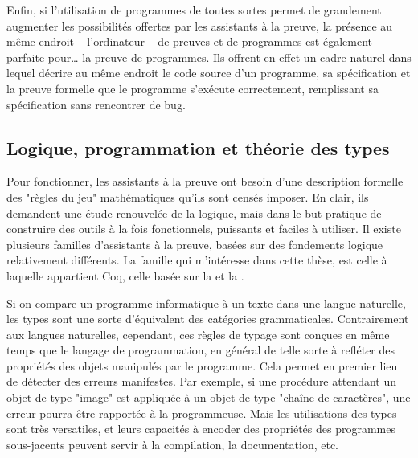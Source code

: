 Enfin, si l’utilisation de programmes de toutes sortes permet de grandement augmenter
les possibilités offertes par les assistants à la preuve,
la présence au même endroit – l’ordinateur –
de preuves et de programmes est également parfaite pour… la preuve de programmes.
Ils offrent en effet un cadre naturel dans lequel décrire au même endroit
le code source d’un programme, sa spécification et la preuve formelle que le
programme s’exécute correctement,
remplissant sa spécification sans rencontrer de bug.

\subsection{Logique, programmation et théorie des types}

Pour fonctionner, les assistants à la preuve ont besoin d’une
description formelle des "règles du jeu" mathématiques qu’ils sont censés imposer.
En clair, ils demandent une étude renouvelée de la logique, mais dans le but
pratique de construire des outils à la fois fonctionnels,
puissants et faciles à utiliser.
Il existe plusieurs familles d’assistants à la preuve, basées sur des fondements
logique relativement différents. La famille qui m’intéresse dans cette thèse, est
celle à laquelle appartient Coq, celle basée sur la
 et la .

Si on compare un programme informatique à un texte dans une langue naturelle,
les types sont une sorte d’équivalent des catégories grammaticales.
Contrairement aux langues naturelles, cependant, ces règles de typage sont conçues
en même temps que le langage de programmation, en général
de telle sorte à refléter des propriétés
des objets manipulés par le programme. Cela permet en premier lieu de
détecter des erreurs manifestes.
Par exemple, si une procédure attendant un objet de type "image" est
appliquée à un objet de type "chaîne de caractères", une erreur pourra être rapportée
à la programmeuse.
Mais les utilisations des types sont très versatiles, et leurs capacités à encoder
des propriétés des programmes sous-jacents peuvent servir à la compilation, la
documentation, etc.


